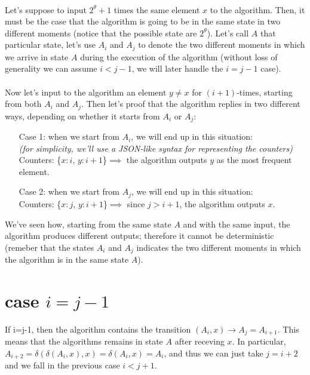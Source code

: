\documentclass[a4paper]{article}
\begin{document}
\\
Let's suppose to input $2^{\theta}+1$ times the same element $x$ to the algorithm. Then, it must be the case that the algorithm is going to be in the same state in two different moments (notice that the possible state are $2^{\theta}$). Let's call $A$ that particular state, let's use $A_i$ and $A_j$ to denote the two different moments in which we arrive in state $A$ during the execution of the algorithm (without loss of generality we can assume $i < j-1$, we will later handle the $i=j-1$ case).
\\
\\
Now let's input to the algorithm an element $y\neq x$ for $(i+1)$-times, starting from both $A_i$ and $A_j$. Then let's proof that the algorithm replies in two different ways, depending on whether it starts from $A_i$ or $A_j$:
\begin{itemize}
\item[Case 1:] when we start from $A_i$, we will end up in this situation:\\ 
\textit{(for simplicity, we'll use a JSON-like syntax for representing the counters)}\\ Counters: \{$ x : i$,  $ y: i+1$\}$ \implies $ the algorithm outputs $y$ as the most frequent element.
\item[Case 2:] when we start from $A_j$, we will end up in this situation:\\
 Counters: \{$ x : j$,  $ y: i+1$\}$ \implies$ since $j>i+1$, the algorithm outputs $x$.
\end{itemize}
We've seen how, starting from the same state $A$ and with the same input, the algorithm produces different outputs; therefore it cannot be deterministic (remeber that the states $A_i$ and $A_j$ indicates the two different moments in which the algorithm is in the same state $A$).

\section*{case $i=j-1$}
If i=j-1, then the algorithm contains the transition $(A_i, x) \rightarrow A_j = A_{i+1}$. This means that the algorithms remains in state $A$ after receving $x$. In particular, $A_{i+2} = \delta (\delta(A_i,x), x) = \delta(A_i, x) = A_i$, and thus we can just take $j=i+2$ and we fall in the previous case $i<j+1$.
\end{document}
